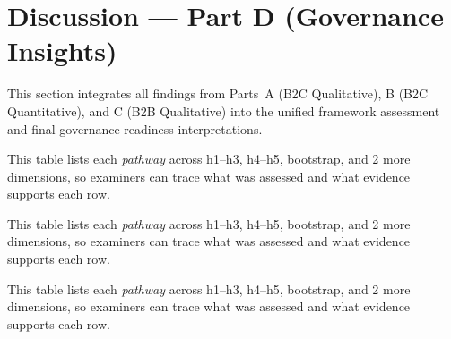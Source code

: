 \section{Discussion --- Part D (Governance Insights)}
\label{sec:ch5_part_d}

This section integrates all findings from Parts~A (B2C Qualitative), B (B2C Quantitative), and C (B2B Qualitative) into the unified framework assessment and final governance-readiness interpretations.

\noindent This table lists each \textit{pathway} across h1--h3, h4--h5, bootstrap, and 2 more dimensions, so examiners can trace what was assessed and what evidence supports each row.



\noindent This table lists each \textit{pathway} across h1--h3, h4--h5, bootstrap, and 2 more dimensions, so examiners can trace what was assessed and what evidence supports each row.


\noindent This table lists each \textit{pathway} across h1--h3, h4--h5, bootstrap, and 2 more dimensions, so examiners can trace what was assessed and what evidence supports each row.




